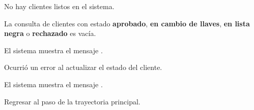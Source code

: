 {  \begin{trayectoriaAlternativa}
    {No hay clientes listos en el sistema.}

    \item La consulta de clientes con estado \textbf{aprobado},
    \textbf{en cambio de llaves}, \textbf{en lista negra} o \textbf{rechazado}
    es vacía.

    \item El sistema muestra el mensaje
      .

  \end{trayectoriaAlternativa}

  \begin{trayectoriaAlternativa}
    {Ocurrió un error al actualizar el estado del cliente.}

    \item El sistema muestra el mensaje
      .

    \item Regresar al paso  de la
      trayectoria principal.

  \end{trayectoriaAlternativa}
}
